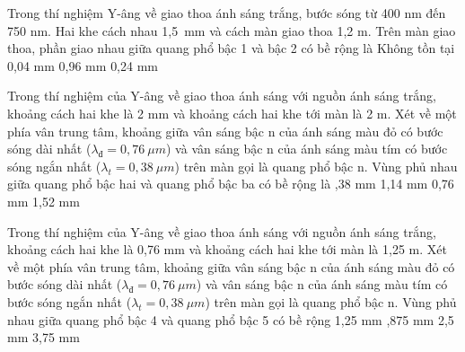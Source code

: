 \begin{vidu}%
Trong thí nghiệm Y-âng về giao thoa ánh sáng trắng, bước sóng từ 400 nm đến 750 nm. Hai khe cách nhau 1,5\ mm và cách màn  giao thoa 1,2 m. Trên màn giao thoa, phần giao nhau giữa quang phổ bậc 1 và bậc 2 có bề rộng là
\choice
{\True Không tồn tại}
{0,04 mm}
{0,96 mm}
{0,24 mm}
\end{vidu} 
\begin{vidu}%
Trong thí nghiệm của Y-âng về giao thoa ánh sáng với nguồn ánh sáng trắng, khoảng cách hai khe là 2 mm và khoảng cách hai khe tới màn là 2 m. Xét về một phía vân trung tâm, khoảng giữa vân sáng bậc n của ánh sáng màu đỏ có bước sóng dài nhất ($\lambda_{\text{đ}}=0,76\ \mu m $) và vân sáng bậc n của ánh sáng màu tím có bước sóng ngắn nhất (${{\lambda}_{t}}=0,38\ \mu m $) trên màn gọi là quang phổ bậc n. Vùng phủ nhau giữa quang phổ bậc hai và quang phổ bậc ba có bề rộng là
\choice
{,38 mm}
{1,14 mm}
{0,76 mm}
{1,52 mm}
\end{vidu} 
\begin{vidu}%
Trong thí nghiệm của Y-âng về giao thoa ánh sáng với nguồn ánh sáng trắng, khoảng cách hai khe là 0,76 mm và khoảng cách hai khe tới màn là 1,25 m. Xét về một phía vân trung tâm, khoảng giữa vân sáng bậc n của ánh sáng màu đỏ có bước sóng dài nhất ($\lambda_{\text{đ}}=0,76\ \mu m $) và vân sáng bậc n của ánh sáng màu tím có bước sóng ngắn nhất (${{\lambda}_{t}}=0,38\ \mu m $) trên màn gọi là quang phổ bậc n. Vùng phủ nhau giữa quang phổ bậc 4 và quang phổ bậc 5 có bề rộng
\choice
{1,25 mm}
{,875 mm}
{2,5 mm}
{3,75 mm}
\end{vidu} 
